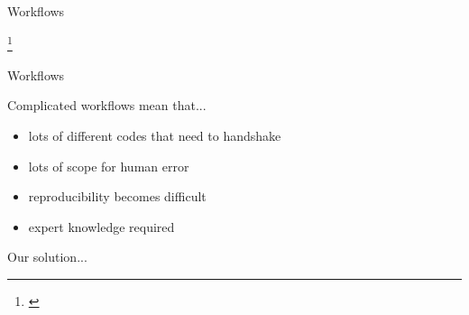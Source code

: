 \documentclass[xcolor=table,aspectratio=169]{beamer}
\newcommand\blfootcite[1]{%
  \begingroup
  \renewcommand\thefootnote{}\footnote{\hspace{-4ex}\cite{#1}}%
  \addtocounter{footnote}{-1}%
  \endgroup
}
\numberwithin{equation}{section}
\begin{document}
\begin{frame}{Workflows}

   \vspace{-1.5ex}

   \blfootcite{Linscott2023}


\end{frame}


\begin{frame}{Workflows}



   Complicated workflows mean that...
   \begin{itemize}
      \item lots of different codes that need to handshake
      \item lots of scope for human error
      \item reproducibility becomes difficult
      \item expert knowledge required
   \end{itemize}

   Our solution...

\end{frame}
\end{document}
